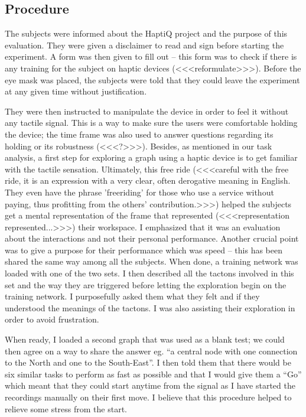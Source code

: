 \subsection{Procedure}\label{procedure}

The subjects were informed about the HaptiQ project and the purpose of this evaluation. They were given a disclaimer to read and sign before starting the experiment. A form was then given to fill out -- this form was to check if there is any training for the subject on haptic devices (<<<reformulate>>>). Before the eye mask was placed, the subjects were told that they could leave the experiment at any given time without justification.

They were then instructed to manipulate the device in order to feel it without any tactile signal. This is a way to make sure the users were comfortable holding the device; the time frame was also used to answer questions regarding its holding or its robustness (<<<?>>>). Besides, as mentioned in our task analysis, a first step for exploring a graph using a haptic device is to get familiar with the tactile sensation. Ultimately, this free ride (<<<careful with the free ride, it is an expression with a very clear, often derogative meaning in English. They even have the phrase 'freeriding' for those who use a service without paying, thus profitting from the others' contribution.>>>) helped the subjects get a mental representation of the frame that represented (<<<representation represented...>>>) their workspace. I emphasized that it was an evaluation about the interactions and not their personal performance. Another crucial point was to give a purpose for their performance which was speed -- this has been shared the same way among all the subjects. When done, a training network was loaded with one of the two sets. I then described all the
tactons involved in this set and the way they are triggered before letting the exploration begin on the training network. I purposefully asked them what they felt and if they understood the meanings of the tactons. I was also assisting their exploration in order to avoid frustration. 

When ready, I loaded a second graph that was used as a blank test; we could then agree on a way to share the answer eg. ``a central node with one connection to the North and one to the South-East''. I then told them that there would be six similar tasks to perform as fast as possible and that I would give them a ``Go'' which meant that they could start anytime from the signal as I have started the recordings manually on their first move. I believe that this procedure helped to relieve some stress from the start.

